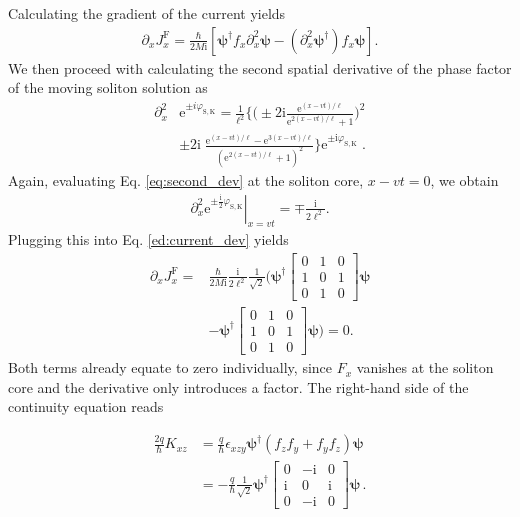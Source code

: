 \documentclass[aps,

               pra,
               twocolumn,
               amsmath,
               amssymb,
               superscriptaddress,
               reprint,
               10pt
              ]{revtex4-2}
\newcommand{\e}{\mathrm{e}}
\begin{document}
\begin{appendix}
Calculating the gradient of the current yields
\begin{align}
    \partial_x {J}_x^\mathrm{F} = \frac{\hbar}{2M\mathrm{i}} \left[\boldsymbol{\psi}^{\dagger} f_x \partial_x^2 \boldsymbol{\psi} - (\partial_x^2 \boldsymbol{\psi}^{\dagger}) f_x \boldsymbol{\psi}\right].
    \label{ed:current_dev}
\end{align}
We then proceed with calculating the second spatial derivative of the phase factor of the moving soliton solution as
\begin{align}
    \partial_x^2 &\e^{\pm i \varphi_{\mathrm{S, K}}} = \frac{1}{\ell^2}\bigg\{\Big(\pm 2\mathrm{i} \frac{\e^{(x-vt)/\ell}}{\e^{2(x-vt)/\ell}+1}\Big)^2 \nonumber \\
    &\pm 2 \mathrm{i} \; \frac{\e^{(x-vt)/\ell}-\e^{3(x-vt)/\ell} }{(\e^{2(x-vt)/\ell}+1)^2}  \bigg\}\e^{\pm \mathrm{i}\varphi_{\mathrm{S,K}}}\;.
    \label{eq:second_dev}
\end{align}
Again, evaluating Eq. \eqref{eq:second_dev} at the soliton core, $x-vt = 0$, we obtain
\begin{align}
    \left.\partial_x^2 \e^{\pm \frac{\mathrm{i}}{2} \varphi_{\mathrm{S, K}}}\right|_{x=vt} =  \mp \frac{\mathrm{i}}{2\ell^2} .
\end{align}
Plugging this into Eq. \eqref{ed:current_dev} yields
\begin{align}
   \partial_x {J}_x^\mathrm{F} =&
     \frac{\hbar}{2M \mathrm{i}} \frac{\mathrm{i}}{2\ell^2} \frac{1}{\sqrt{2}}\bigg(\boldsymbol{\psi}^{\dagger}
     \begin{bmatrix}
0 & 1 & 0 \\
1 & 0 & 1 \\
0 & 1 & 0
\end{bmatrix}
\boldsymbol{\psi} \nonumber \\
&- \boldsymbol{\psi}^{\dagger}
     \begin{bmatrix}
0 & 1 & 0 \\
1 & 0 & 1 \\
0 & 1 & 0
\end{bmatrix}
\boldsymbol{\psi} \bigg) = 0.
\end{align}
Both terms already equate to zero individually, since $F_x$ vanishes at the soliton core and the derivative only introduces a factor.
The right-hand side of the continuity equation reads

\begin{align}
   \frac{2q}{\hbar} K_{xz} &= \frac{q}{\hbar} \epsilon_{xzy}  \boldsymbol{\psi}^{\dagger} (f_zf_y + f_yf_z) \boldsymbol{\psi} \\
   &= -\frac{q}{\hbar} \frac{1}{\sqrt{2}} \boldsymbol{\psi}^{\dagger}
   \begin{bmatrix}
0 & -\mathrm{i} & 0 \\
\mathrm{i} & 0 & \mathrm{i} \\
0 & -\mathrm{i} & 0
\end{bmatrix}
\boldsymbol{\psi}  \,. \label{eq:LHSconteq_filledout}
\end{align}


\end{appendix}
\end{document}
